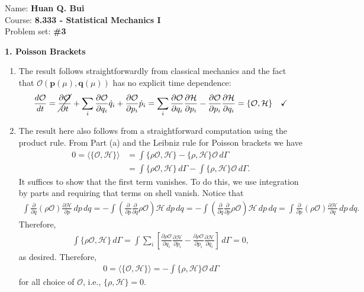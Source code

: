 \documentclass{article}
\theoremstyle{definition}
\newcommand{\p}{\partial}
\newcommand{\ham}{\mathcal{H}}
\newcommand{\f}[2]{\frac{#1}{#2}}
\newcommand{\lp}{\left(}
\newcommand{\rp}{\right)}
\newcommand{\lb}{\left[}
\newcommand{\rb}{\right]}
\begin{document}
		\begin{framed}
			\noindent Name: \textbf{Huan Q. Bui}\\
			Course: \textbf{8.333 - Statistical Mechanics I}\\
			Problem set: \textbf{\#3}
		\end{framed}
	



\noindent \textbf{1. Poisson Brackets}

\begin{enumerate}[label=(\alph*)]
	\item The result follows straightforwardly from classical mechanics and the fact that $\mathcal{O(\mathbf{p}(\mu), \mathbf{q}(\mu))}$ has no explicit time dependence:
	\begin{align*}
	\f{d\mathcal{O}}{d t} = \cancel{\f{\p \mathcal{O}}{\p t}} 
	+ \sum_i\f{\p \mathcal{O}}{\p q_i}\dot{q}_i + \f{\p \mathcal{O}}{\p p_i} \dot{p}_i 
	= \sum_i \f{\p \mathcal{O}}{\p q_i}\f{\p \ham }{\p p_i} - \f{\p \mathcal{O}}{\p p_i}\f{\p \ham}{\p q_i}
	 = \{ \mathcal{O},\ham \} \quad\checkmark
	\end{align*}
	
	\item The result here also follows from a straightforward computation using the product rule. From Part (a) and the Leibniz rule for Poisson brackets we have
	\begin{align*}
	0 =\langle \{ \mathcal{O}, \ham \}\rangle 
	&= \int \{ \rho \mathcal{O}, \ham \} - \{ \rho,\ham  \}\mathcal{O}  \,d\Gamma \\
	&= \int \{ \rho \mathcal{O}, \ham \}\,d\Gamma - \int \{ \rho,\ham  \}\mathcal{O}  \,d\Gamma. 
	\end{align*}
	It suffices to show that the first term vanishes. To do this, we use integration by parts and requiring that terms on shell vanish. Notice that
	\begin{align*}
	\int \f{\p}{\p q} (\rho \mathcal{O}) \f{\p \ham }{\p p}  \,dp\,dq = -\int \lp \f{\p}{\p p} \f{\p}{\p q} \rho \mathcal{O}\rp \ham  \,dp\, dq = -\int \lp \f{\p}{\p q} \f{\p}{\p p} \rho \mathcal{O}\rp \ham  \,dp\, dq = \int \f{\p}{\p p}(\rho \mathcal{O}) \f{\p \ham}{\p q} \,dp\,dq.
	\end{align*}
	Therefore, 
	\begin{align*}
	\int \{ \rho \mathcal{O}, \ham \}\,d\Gamma = \int \sum_i \lb \f{\p \rho \mathcal{O}}{\p q_i}\f{\p \ham}{\p p_i} - \f{\p \rho \mathcal{O}}{\p p_i}\f{\p \ham}{\p q_i} \rb \,d\Gamma = 0,
	\end{align*}
	as desired. Therefore, 
	\begin{align*}
	0 =\langle \{ \mathcal{O}, \ham \}\rangle = -\int \{ \rho,\ham  \}\mathcal{O}  \,d\Gamma
	\end{align*}
	for all choice of $\mathcal{O}$, i.e., $\{  \rho, \ham \} = 0$. 
	
\end{enumerate}
\end{document}
